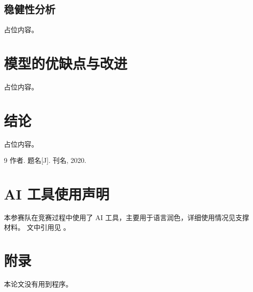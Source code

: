 \documentclass[12pt,a4paper]{ctexart}
\begin{document}
\subsection{稳健性分析}
占位内容。
\section{模型的优缺点与改进}
占位内容。
\section{结论}
占位内容。

\begin{thebibliography}{9}
 作者. 题名[J]. 刊名, 2020.
\end{thebibliography}

\section*{AI 工具使用声明}
本参赛队在竞赛过程中使用了 AI 工具，主要用于语言润色，详细使用情况见支撑材料。
文中引用见 \cite{ref1}。

\appendix
\section{附录}
本论文没有用到程序。
\end{document}
